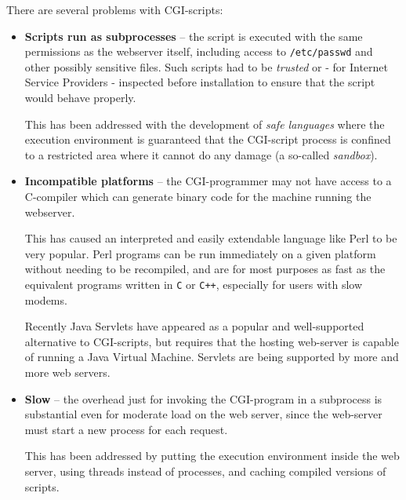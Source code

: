 
There are several problems with CGI-scripts:

\begin{itemize}
\item \textbf{Scripts run as subprocesses} -- the script is executed
  with the same permissions as the webserver itself, including access
  to \texttt{/etc/passwd} and other possibly sensitive files.  Such
  scripts had to be \textit{trusted} or - for Internet Service
  Providers - inspected before installation to ensure that the script
  would behave properly.
  
  This has been addressed with the development of \textit{safe
    languages} where the execution environment is guaranteed that the
    CGI-script process is confined to a restricted area where it
    cannot do any damage (a so-called \textit{sandbox}).

\item \textbf{Incompatible platforms} -- the CGI-programmer may not
  have access to a C-compiler which can generate binary code for the
  machine running the webserver.

  This has caused an interpreted and easily extendable language like
  Perl to be very popular.  Perl programs can be run immediately on a
  given platform without needing to be recompiled, and are for most
  purposes as fast as the equivalent programs written in \texttt{C} or
  \texttt{C++}, especially for users with slow modems.
  
  Recently Java Servlets have
  appeared as a popular and well-supported alternative to CGI-scripts,
  but requires that the hosting web-server is capable of running a
  Java Virtual Machine.  Servlets are being supported by more and more
  web servers.

\item \textbf{Slow} -- the overhead just for invoking the CGI-program
  in a subprocess is substantial even for moderate load on the web
  server, since the web-server must start a new process for each
  request.

  This has been addressed by putting the execution environment inside
  the web server, using threads instead of processes, and caching
  compiled versions of scripts.

\end{itemize}


